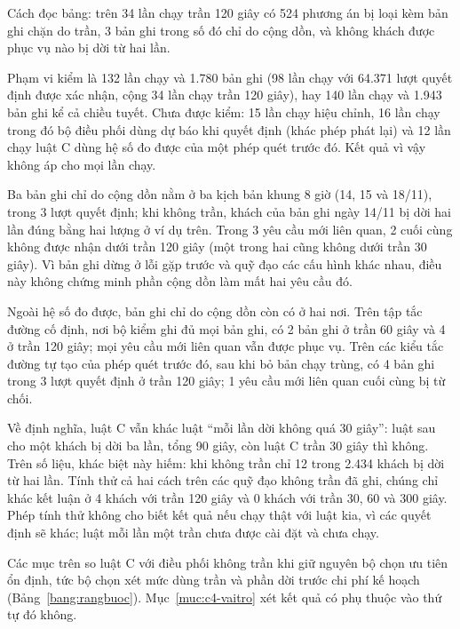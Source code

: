 Cách đọc bảng: trên 34 lần chạy trần 120 giây có 524 phương án bị loại kèm bản ghi chặn do trần, 3 bản ghi trong số đó
chỉ do cộng dồn, và không khách được phục vụ nào bị dời từ hai lần.

Phạm vi kiểm là 132 lần chạy và 1.780 bản ghi (98 lần chạy với 64.371 lượt quyết định được xác nhận, cộng 34 lần chạy
trần 120 giây), hay 140 lần chạy và 1.943 bản ghi kể cả chiều tuyết. Chưa được kiểm: 15 lần chạy hiệu chỉnh, 16 lần
chạy trong đó bộ điều phối dùng dự báo khi quyết định (khác phép phát lại) và 12 lần chạy luật C dùng hệ số đo được
của một phép quét trước đó. Kết quả vì vậy không áp cho mọi lần chạy.

Ba bản ghi chỉ do cộng dồn nằm ở ba kịch bản khung 8 giờ (14, 15 và 18/11), trong 3 lượt quyết định; khi không trần,
khách của bản ghi ngày 14/11 bị dời hai lần đúng bằng hai lượng ở ví dụ trên. Trong 3 yêu cầu mới liên quan, 2 cuối
cùng không được nhận dưới trần 120 giây (một trong hai cũng không dưới trần 30 giây). Vì bản ghi dừng ở lỗi gặp trước
và quỹ đạo các cấu hình khác nhau, điều này không chứng minh phần cộng dồn làm mất hai yêu cầu đó.

Ngoài hệ số đo được, bản ghi chỉ do cộng dồn còn có ở hai nơi. Trên tập tắc đường cố định, nơi bộ kiểm ghi đủ mọi bản
ghi, có 2 bản ghi ở trần 60 giây và 4 ở trần 120 giây; mọi yêu cầu mới liên quan vẫn được phục vụ. Trên các kiểu tắc
đường tự tạo của phép quét trước đó, sau khi bỏ bản chạy trùng, có 4 bản ghi trong 3 lượt quyết định ở trần 120 giây;
1 yêu cầu mới liên quan cuối cùng bị từ chối.

Về định nghĩa, luật C vẫn khác luật ``mỗi lần dời không quá 30 giây'': luật sau cho một khách bị dời ba lần, tổng 90
giây, còn luật C trần 30 giây thì không. Trên số liệu, khác biệt này hiếm: khi không trần chỉ 12 trong 2.434 khách bị
dời từ hai lần. Tính thử cả hai cách trên các quỹ đạo không trần đã ghi, chúng chỉ khác kết luận ở 4 khách với trần
120 giây và 0 khách với trần 30, 60 và 300 giây. Phép tính thử không cho biết kết quả nếu chạy thật với luật kia, vì
các quyết định sẽ khác; luật mỗi lần một trần chưa được cài đặt và chưa chạy.

Các mục trên so luật C với điều phối không trần khi giữ nguyên bộ chọn ưu tiên ổn định, tức bộ chọn xét mức dùng trần
và phần dời trước chi phí kế hoạch (Bảng~\ref{bang:rangbuoc}). Mục~\ref{muc:c4-vaitro} xét kết quả có phụ thuộc vào
thứ tự đó không.
